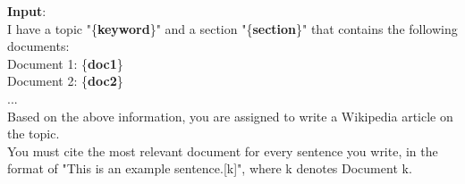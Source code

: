 \begin{tcolorbox}[title = {Section Generation Prompt}]

\textbf{Input}:\\
I have a topic "\{\textbf{keyword}\}" and a section "\{\textbf{section}\}" that contains the following documents: \\
Document 1: \{\textbf{doc1}\} \\
Document 2: \{\textbf{doc2}\} \\
... \\
Based on the above information, you are assigned to write a Wikipedia article on the topic. \\
You must cite the most relevant document for every sentence you write, in the format of "This is an example sentence.[k]", where k denotes Document k. \\
\end{tcolorbox}

